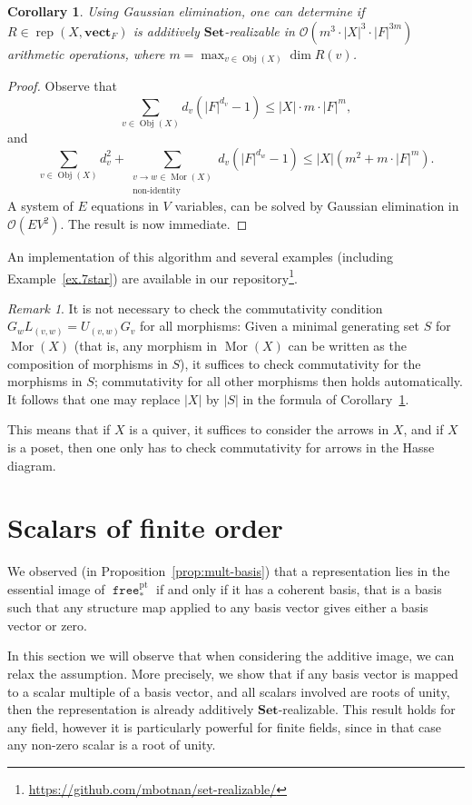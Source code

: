 \documentclass[a4paper]{amsart}
\theoremstyle{plain}
\newtheorem{corollary}[theorem]{Corollary}
\theoremstyle{definition}
\theoremstyle{remark}
\newtheorem{remark}[theorem]{Remark}
\newcommand{\funct}[1]{\operatorname{\mathtt{#1}}}
\newcommand{\Set}{\mathbf{Set}}
\newcommand{\vectF}{\mathbf{vect}_F}
\DeclareMathOperator{\rep}{rep}
\begin{document}
\begin{corollary}
\label{cor.algo}
Using Gaussian elimination, one can determine if $R\in \rep(X,\vectF)$ is additively $\Set$-realizable in $\mathcal{O}\left(m^3\cdot |X|^3\cdot |F|^{3m} \right)$ arithmetic operations, where $m = \max_{v\in \operatorname{Obj}(X)} \dim R(v)$.
\end{corollary}
\begin{proof}
Observe that 
\[ \sum_{v\in \operatorname{Obj}(X)}d_v(|F|^{d_v}-1) \leq |X|\cdot m\cdot |F|^m ,\]
and 
\[\sum_{v\in \operatorname{Obj}(X)}d_v^2 + \sum_{\substack{v\to w \in \operatorname{Mor}(X)\\ \text{non-identity}}} d_v(|F|^{d_w}-1) \leq |X|(m^2+m\cdot |F|^m).\]
A system of $E$ equations in $V$ variables, can be solved by Gaussian elimination in $\mathcal{O}(EV^2)$. The result is now immediate. 
\end{proof}

An implementation of this algorithm and several examples (including Example~\ref{ex.7star}) are available in our repository\footnote{\url{https://github.com/mbotnan/set-realizable/}}.
\begin{remark}
\label{remark.minimalarrows}
It is not necessary to check the commutativity condition \( G_wL_{(v,w)} = U_{(v,w)}G_v \) for all morphisms: Given a minimal generating set $S$ for $\operatorname{Mor}(X)$ (that is, any morphism in $\operatorname{Mor}(X)$ can be written as the composition of morphisms in $S$), it suffices to check commutativity for the morphisms in \( S \); commutativity for all other morphisms then holds automatically. It follows that one may replace $|X|$ by $|S|$ in the formula of Corollary~\ref{cor.algo}.

This means that if $X$ is a quiver, it suffices to consider the arrows in $X$, and if $X$ is a poset, then one only has to check commutativity for arrows in the Hasse diagram.
\end{remark} 

\section{Scalars of finite order}
\label{sec:scalarsfiniteorder}
We observed (in Proposition~\ref{prop:mult-basis}) that a representation lies in the essential image of \( \funct{free}^\mathrm{pt}_* \) if and only if it has a coherent basis, that is a basis such that any structure map applied to any basis vector gives either a basis vector or zero.

In this section we will observe that when considering the additive image, we can relax the assumption. More precisely, we show that if any basis vector is mapped to a scalar multiple of a basis vector, and all scalars involved are roots of unity, then the representation is already additively \( \Set \)-realizable. This result holds for any field, however it is particularly powerful for finite fields, since in that case any non-zero scalar is a root of unity.
\end{document}
